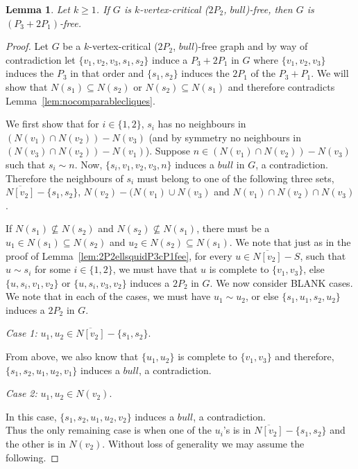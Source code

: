 \documentclass[11pt]{article}
\newtheorem{lemma}[theorem]{Lemma}
\theoremstyle{definition}
\begin{document}
\begin{lemma}\label{lem:2P2bullP32P1fee}
Let $k\ge 1$. If $G$ is $k$-vertex-critical ($2P_2$, $bull$)-free, then $G$ is $(P_3+2 P_1)$-free.
\end{lemma}
\begin{proof}
Let $G$ be a $k$-vertex-critical ($2P_2$, $bull$)-free graph and by way of contradiction let $\{v_1,v_2,v_3,s_1,s_2\}$ induce a $P_3+2P_1$ in $G$ where $\{v_1,v_2,v_3\}$ induces the $P_3$ in that order and $\{s_1,s_2\}$ induces the $2P_1$ of the $P_3+P_1$. We will show that $N(s_1)\subseteq N(s_2)$ or $N(s_2)\subseteq N(s_1)$ and therefore contradicts Lemma~\ref{lem:nocomparablecliques}.

We first show that for $i\in\{1,2\}$, $s_i$ has no neighbours in $(N(v_1)\cap N(v_2))-N(v_3)$  (and by symmetry no neighbours in $(N(v_3)\cap N(v_2))-N(v_1)$). Suppose $n\in (N(v_1)\cap N(v_2))-N(v_3)$ such that $s_i\sim n$. Now, $\{s_i,v_1,v_2,v_3,n\}$ induces a $bull$ in $G$, a contradiction. Therefore the neighbours of $s_i$ must belong to one of the following three sets, $\overline{N[v_2]}-\{s_1,s_2\}$, $N(v_2)-(N(v_1)\cup N(v_3)$ and $N(v_1)\cap N(v_2)\cap N(v_3)$. 

If $N(s_1)\not\subseteq N(s_2)$ and $N(s_2)\not\subseteq N(s_1)$, there must be a $u_1\in N(s_1)\subseteq N(s_2)$ and $u_2\in N(s_2)\subseteq N(s_1)$. We note that just as in the proof of Lemma~\ref{lem:2P2ellsquidP3cP1fee}, for every $u\in \overline{N[v_2]}-S$, such that $u\sim s_i$ for some $i\in \{1,2\}$, we must have that $u$ is complete to $\{v_1,v_3\}$, else $\{u,s_i,v_1,v_2\}$ or $\{u,s_i,v_3,v_2\}$ induces a $2P_2$ in $G$. We now consider BLANK cases. We note that in each of the cases, we must have $u_1\sim u_2$, or else $\{s_1,u_1,s_2,u_2\}$ induces a $2P_2$ in $G$.

\noindent \textit{Case 1:} $u_1,u_2\in \overline{N[v_2]}-\{s_1,s_2\}$.

From above, we also know that $\{u_1,u_2\}$ is complete to $\{v_1,v_3\}$ and therefore, $\{s_1,s_2,u_1,u_2,v_1\}$ induces a $bull$, a contradiction.

\noindent \textit{Case 2:} $u_1,u_2\in N(v_2)$.

In this case, $\{s_1,s_2,u_1,u_2,v_2\}$ induces a $bull$, a contradiction.\\

Thus the only remaining case is when one of the $u_i$'s is in $\overline{N[v_2]}-\{s_1,s_2\}$ and the other is in $N(v_2)$. Without loss of generality we may assume the following.


\end{proof}
\end{document}

